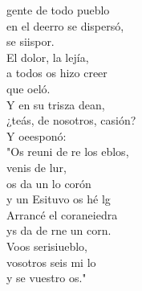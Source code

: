 \documentclass[12pt]{article}
\begin{document}
\begin{multicols*}{2}
\begin{cancion}%
	gente de todo  pueblo\\
	en el deerro se dispersó,\\
	se siispor.\\
	El dolor, la lejía,\\
	a todos os hizo creer\\
	que oeló.\\
	Y en su trisza dean,\\
	¿teás, de nosotros, casión?\\
	Y oeesponó:\\
	"Os reuni de re los eblos,\\
	venis de  lur,\\
	os da un lo corón \\
	y un Esituvo os hé lg\\
	Arrancé el coraneiedra\\
	ys da de rne un corn.  \\
	Voos serisiueblo, \\
	vosotros seis mi lo\\
	y  se vuestro os." \\
\end{cancion}%


\end{multicols*}
\end{document}
